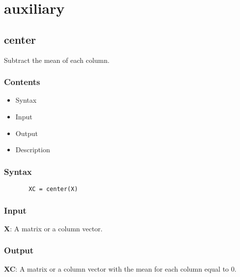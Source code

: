 \documentclass[a4paper,11pt,openany]{memoir}
\begin{document}
\newpage

\chapter{auxiliary}

    
\rmfamily
\color{black}\section{center}

\begin{par}
Subtract the mean of each column.
\end{par} \vspace{1em}

\subsection*{Contents}

\begin{itemize}
\setlength{\itemsep}{-1ex}
   \item Syntax
   \item Input
   \item Output
   \item Description
\end{itemize}


\subsection*{Syntax}


\begin{verbatim}       XC = center(X)\end{verbatim}
    

\subsection*{Input}

\begin{par}
\textbf{X}: A matrix or a column vector.
\end{par} \vspace{1em}


\subsection*{Output}

\begin{par}
\textbf{XC}: A matrix or a column vector with the mean for each column equal to 0.
\end{par} \vspace{1em}
\end{document}
